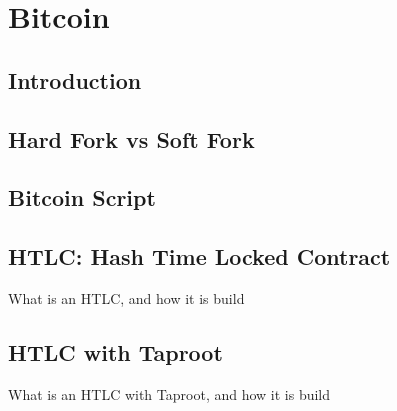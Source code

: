 \chapter{Bitcoin}

\section{Introduction}

\section{Hard Fork vs Soft Fork}
\label{sec:hard_vs_soft}

\section{Bitcoin Script}

\section{HTLC: Hash Time Locked Contract}
\label{sec:htlc_intro}
What is an HTLC, and how it is build

\section{HTLC with Taproot}
What is an HTLC with Taproot, and how it is build
